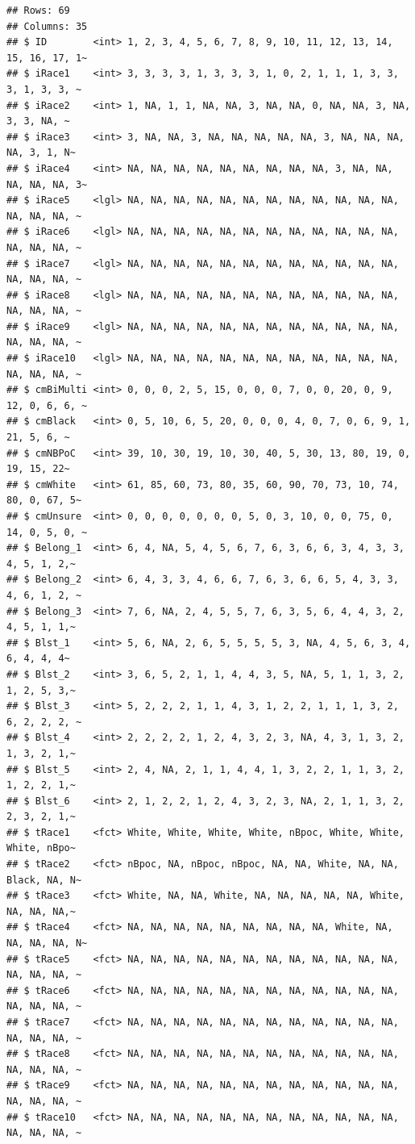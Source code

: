\documentclass[
  11pt,
]{book}
\begin{document}
\begin{verbatim}
## Rows: 69
## Columns: 35
## $ ID        <int> 1, 2, 3, 4, 5, 6, 7, 8, 9, 10, 11, 12, 13, 14, 15, 16, 17, 1~
## $ iRace1    <int> 3, 3, 3, 3, 1, 3, 3, 3, 1, 0, 2, 1, 1, 1, 3, 3, 3, 1, 3, 3, ~
## $ iRace2    <int> 1, NA, 1, 1, NA, NA, 3, NA, NA, 0, NA, NA, 3, NA, 3, 3, NA, ~
## $ iRace3    <int> 3, NA, NA, 3, NA, NA, NA, NA, NA, 3, NA, NA, NA, NA, 3, 1, N~
## $ iRace4    <int> NA, NA, NA, NA, NA, NA, NA, NA, NA, 3, NA, NA, NA, NA, NA, 3~
## $ iRace5    <lgl> NA, NA, NA, NA, NA, NA, NA, NA, NA, NA, NA, NA, NA, NA, NA, ~
## $ iRace6    <lgl> NA, NA, NA, NA, NA, NA, NA, NA, NA, NA, NA, NA, NA, NA, NA, ~
## $ iRace7    <lgl> NA, NA, NA, NA, NA, NA, NA, NA, NA, NA, NA, NA, NA, NA, NA, ~
## $ iRace8    <lgl> NA, NA, NA, NA, NA, NA, NA, NA, NA, NA, NA, NA, NA, NA, NA, ~
## $ iRace9    <lgl> NA, NA, NA, NA, NA, NA, NA, NA, NA, NA, NA, NA, NA, NA, NA, ~
## $ iRace10   <lgl> NA, NA, NA, NA, NA, NA, NA, NA, NA, NA, NA, NA, NA, NA, NA, ~
## $ cmBiMulti <int> 0, 0, 0, 2, 5, 15, 0, 0, 0, 7, 0, 0, 20, 0, 9, 12, 0, 6, 6, ~
## $ cmBlack   <int> 0, 5, 10, 6, 5, 20, 0, 0, 0, 4, 0, 7, 0, 6, 9, 1, 21, 5, 6, ~
## $ cmNBPoC   <int> 39, 10, 30, 19, 10, 30, 40, 5, 30, 13, 80, 19, 0, 19, 15, 22~
## $ cmWhite   <int> 61, 85, 60, 73, 80, 35, 60, 90, 70, 73, 10, 74, 80, 0, 67, 5~
## $ cmUnsure  <int> 0, 0, 0, 0, 0, 0, 0, 5, 0, 3, 10, 0, 0, 75, 0, 14, 0, 5, 0, ~
## $ Belong_1  <int> 6, 4, NA, 5, 4, 5, 6, 7, 6, 3, 6, 6, 3, 4, 3, 3, 4, 5, 1, 2,~
## $ Belong_2  <int> 6, 4, 3, 3, 4, 6, 6, 7, 6, 3, 6, 6, 5, 4, 3, 3, 4, 6, 1, 2, ~
## $ Belong_3  <int> 7, 6, NA, 2, 4, 5, 5, 7, 6, 3, 5, 6, 4, 4, 3, 2, 4, 5, 1, 1,~
## $ Blst_1    <int> 5, 6, NA, 2, 6, 5, 5, 5, 5, 3, NA, 4, 5, 6, 3, 4, 6, 4, 4, 4~
## $ Blst_2    <int> 3, 6, 5, 2, 1, 1, 4, 4, 3, 5, NA, 5, 1, 1, 3, 2, 1, 2, 5, 3,~
## $ Blst_3    <int> 5, 2, 2, 2, 1, 1, 4, 3, 1, 2, 2, 1, 1, 1, 3, 2, 6, 2, 2, 2, ~
## $ Blst_4    <int> 2, 2, 2, 2, 1, 2, 4, 3, 2, 3, NA, 4, 3, 1, 3, 2, 1, 3, 2, 1,~
## $ Blst_5    <int> 2, 4, NA, 2, 1, 1, 4, 4, 1, 3, 2, 2, 1, 1, 3, 2, 1, 2, 2, 1,~
## $ Blst_6    <int> 2, 1, 2, 2, 1, 2, 4, 3, 2, 3, NA, 2, 1, 1, 3, 2, 2, 3, 2, 1,~
## $ tRace1    <fct> White, White, White, White, nBpoc, White, White, White, nBpo~
## $ tRace2    <fct> nBpoc, NA, nBpoc, nBpoc, NA, NA, White, NA, NA, Black, NA, N~
## $ tRace3    <fct> White, NA, NA, White, NA, NA, NA, NA, NA, White, NA, NA, NA,~
## $ tRace4    <fct> NA, NA, NA, NA, NA, NA, NA, NA, NA, White, NA, NA, NA, NA, N~
## $ tRace5    <fct> NA, NA, NA, NA, NA, NA, NA, NA, NA, NA, NA, NA, NA, NA, NA, ~
## $ tRace6    <fct> NA, NA, NA, NA, NA, NA, NA, NA, NA, NA, NA, NA, NA, NA, NA, ~
## $ tRace7    <fct> NA, NA, NA, NA, NA, NA, NA, NA, NA, NA, NA, NA, NA, NA, NA, ~
## $ tRace8    <fct> NA, NA, NA, NA, NA, NA, NA, NA, NA, NA, NA, NA, NA, NA, NA, ~
## $ tRace9    <fct> NA, NA, NA, NA, NA, NA, NA, NA, NA, NA, NA, NA, NA, NA, NA, ~
## $ tRace10   <fct> NA, NA, NA, NA, NA, NA, NA, NA, NA, NA, NA, NA, NA, NA, NA, ~
\end{verbatim}
\end{document}

